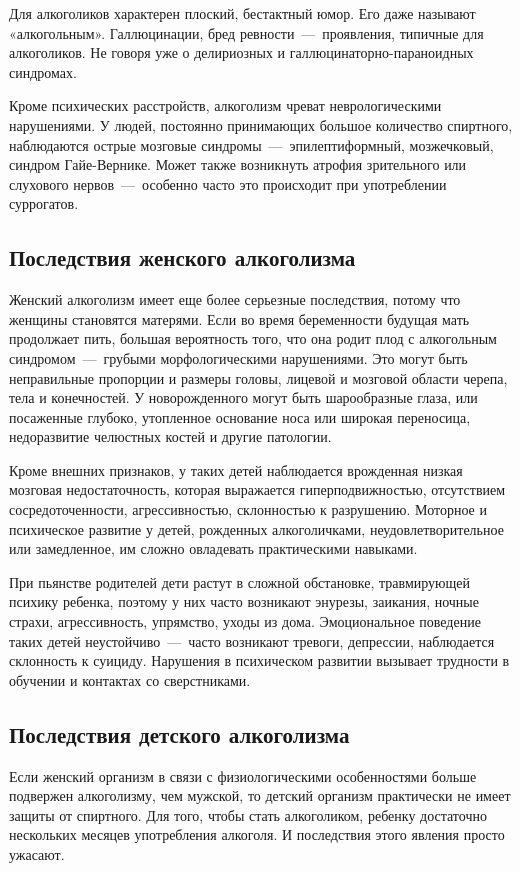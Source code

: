 \documentclass[14pt]{extarticle}
\begin{document}
Для алкоголиков характерен плоский, бестактный юмор. Его даже называют «алкогольным». Галлюцинации, бред ревности~---~проявления, типичные для алкоголиков. Не говоря уже о делириозных и галлюцинаторно-параноидных синдромах.

Кроме психических расстройств, алкоголизм чреват неврологическими нарушениями. У людей, постоянно принимающих большое количество спиртного, наблюдаются острые мозговые синдромы~---~эпилептиформный, мозжечковый, синдром Гайе-Вернике. Может также возникнуть атрофия зрительного или слухового нервов~---~особенно часто это происходит при употреблении суррогатов.

\subsection{Последствия женского алкоголизма}

Женский алкоголизм имеет еще более серьезные последствия, потому что женщины становятся матерями. Если во время беременности будущая мать продолжает пить, большая вероятность того, что она родит плод с алкогольным синдромом~---~грубыми морфологическими нарушениями. Это могут быть неправильные пропорции и размеры головы, лицевой и мозговой области черепа, тела и конечностей. У новорожденного могут быть шарообразные глаза, или посаженные глубоко, утопленное основание носа или широкая переносица, недоразвитие челюстных костей и другие патологии.

Кроме внешних признаков, у таких детей наблюдается врожденная низкая мозговая недостаточность, которая выражается гиперподвижностью, отсутствием сосредоточенности, агрессивностью, склонностью к разрушению. Моторное и психическое развитие у детей, рожденных алкоголичками, неудовлетворительное или замедленное, им сложно овладевать практическими навыками.

При пьянстве родителей дети растут в сложной обстановке, травмирующей психику ребенка, поэтому у них часто возникают энурезы, заикания, ночные страхи, агрессивность, упрямство, уходы из дома. Эмоциональное поведение таких детей неустойчиво~---~часто возникают тревоги, депрессии, наблюдается склонность к суициду. Нарушения в психическом развитии вызывает трудности в обучении и контактах со сверстниками.

\subsection{Последствия детского алкоголизма}

Если женский организм в связи с физиологическими особенностями больше подвержен алкоголизму, чем мужской, то детский организм практически не имеет защиты от спиртного. Для того, чтобы стать алкоголиком, ребенку достаточно нескольких месяцев употребления алкоголя. И последствия этого явления просто ужасают.
\end{document}
